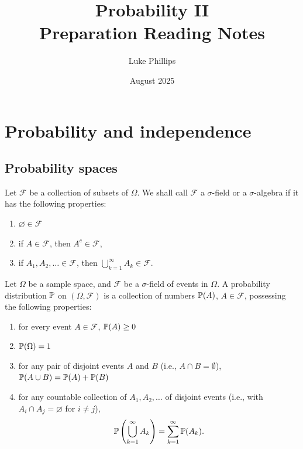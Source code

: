 \documentclass[10pt, a4paper]{article}
\title{Probability II  \\
    \large Preparation Reading Notes}
\author{Luke Phillips}
\date{August 2025}
\begin{document}
\maketitle

\newpage

\tableofcontents

\newpage

\section{Probability and independence}

\subsection{Probability spaces}

\begin{definition}
    Let $\mathcal{F}$ be a collection of subsets of $\Omega$.
    We shall call $\mathcal{F}$ a $\sigma$-field or a $\sigma$-algebra if it has the following properties:
    \begin{enumerate}[label = \arabic*.]
        \item $\varnothing \in \mathcal{F}$

        \item if $A \in \mathcal{F}$,
        then $A ^ c \in \mathcal{F}$,

        \item if $A_1, A_2, \dotsc \in \mathcal{F}$,
        then $\bigcup_{k = 1}^{\infty}A_k \in \mathcal{F}$.
    \end{enumerate}
\end{definition}

\begin{definition}[Probability]
    Let $\Omega$ be a sample space,
    and $\mathcal{F}$ be a $\sigma$-field of events in $\Omega$.
    A probability distribution $\P$ on $(\Omega, \mathcal{F})$ is a collection of numbers $\P(A)$,
    $A \in \mathcal{F}$,
    possessing the following properties:
    \begin{enumerate}[label = A\arabic*]
        \item  for every event $A \in \mathcal{F}$,
        $\P(A) \geq 0$

        \item $\P(\Omega) = 1$

        \item for any pair of disjoint events $A$ and $B$
        (i.e.,
        $A \cap B = \emptyset$),
        $\P(A \cup B) = \P(A) + \P(B)$

        \item for any countable collection of $A_1, A_2, \dotsc$ of disjoint events
        (i.e.,
        with $A_i \cap A_j = \varnothing$ for $i \neq j$),
        \[
        \P\left(\bigcup_{k = 1}^{\infty}A_k\right) = \sum_{k = 1}^{\infty}\P(A_k).
        \]
    \end{enumerate}
\end{definition}
\end{document}
